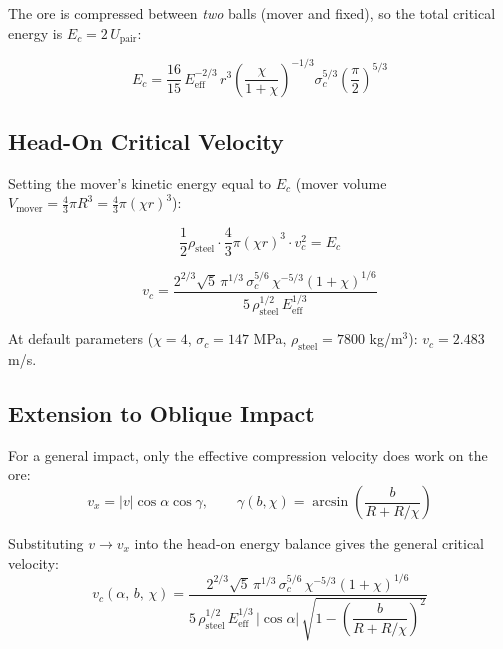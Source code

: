 \documentclass{article}
\begin{document}
The ore is compressed between \emph{two} balls (mover and fixed), so the total
critical energy is $E_c = 2\,U_{\text{pair}}$:

\begin{equation}
    E_c = \frac{16}{15}\,E_{\text{eff}}^{-2/3}\,r^{3}
          \left(\frac{\chi}{1+\chi}\right)^{-1/3}\!\sigma_c^{5/3}
          \left(\frac{\pi}{2}\right)^{5/3}
\end{equation}

\subsection{Head-On Critical Velocity}

Setting the mover's kinetic energy equal to $E_c$
(mover volume $V_{\text{mover}} = \tfrac{4}{3}\pi R^3 = \tfrac{4}{3}\pi(\chi r)^3$):

\begin{equation}
    \frac{1}{2}\rho_{\text{steel}}\cdot\frac{4}{3}\pi(\chi r)^3\cdot v_c^2 = E_c
\end{equation}

\begin{equation}
\boxed{
    v_c = \frac{2^{2/3}\sqrt{5}\,\pi^{1/3}\,\sigma_c^{5/6}\,\chi^{-5/3}(1+\chi)^{1/6}}
               {5\,\rho_{\text{steel}}^{1/2}\,E_{\text{eff}}^{1/3}}
}
\end{equation}

At default parameters ($\chi=4$, $\sigma_c = 147$ MPa, $\rho_{\text{steel}}=7800$ kg/m$^3$):
$v_c = 2.483$ m/s.

\subsection{Extension to Oblique Impact}

For a general impact, only the effective compression velocity does work on the ore:
\begin{equation}
    v_x = |v|\cos\alpha\cos\gamma, \qquad
    \gamma(b,\chi) = \arcsin\!\left(\frac{b}{R + R/\chi}\right)
\end{equation}

Substituting $v \to v_x$ into the head-on energy balance gives the general critical velocity:
\begin{equation}
\boxed{
    v_c(\alpha,\,b,\,\chi)
    = \frac{2^{2/3}\sqrt{5}\,\pi^{1/3}\,\sigma_c^{5/6}\,\chi^{-5/3}(1+\chi)^{1/6}}
           {5\,\rho_{\text{steel}}^{1/2}\,E_{\text{eff}}^{1/3}\,|\cos\alpha|\,\sqrt{1 - \left(\dfrac{b}{R+R/\chi}\right)^{\!2}}}
}
\end{equation}
\end{document}
